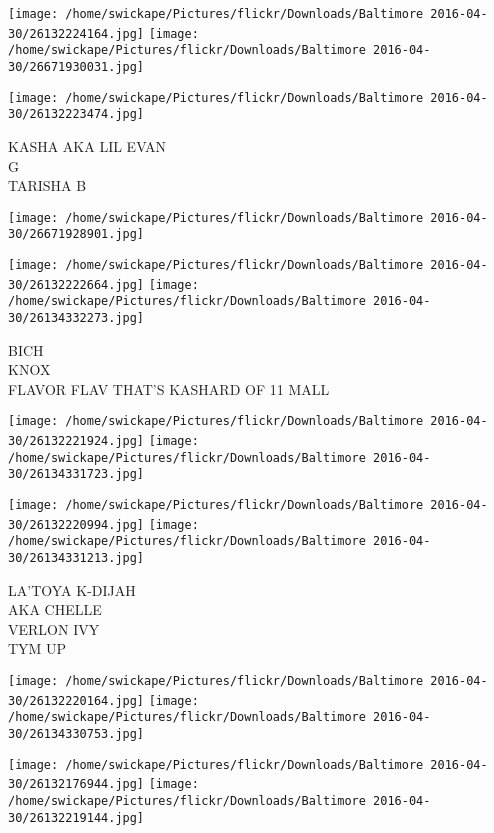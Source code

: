 \documentclass[10pt,letterpaper]{article}
\begin{document}
\texttt{[image: /home/swickape/Pictures/flickr/Downloads/Baltimore 2016-04-30/26132224164.jpg]}
\texttt{[image: /home/swickape/Pictures/flickr/Downloads/Baltimore 2016-04-30/26671930031.jpg]}

\texttt{[image: /home/swickape/Pictures/flickr/Downloads/Baltimore 2016-04-30/26132223474.jpg]}

KASHA AKA LIL EVAN\\
G\\
TARISHA B\\
\pagebreak

\texttt{[image: /home/swickape/Pictures/flickr/Downloads/Baltimore 2016-04-30/26671928901.jpg]}

\vspace{0.25in}
\texttt{[image: /home/swickape/Pictures/flickr/Downloads/Baltimore 2016-04-30/26132222664.jpg]}
\texttt{[image: /home/swickape/Pictures/flickr/Downloads/Baltimore 2016-04-30/26134332273.jpg]}

BICH\\
KNOX\\
FLAVOR FLAV THAT'S KASHARD OF 11 MALL\\
\pagebreak

\texttt{[image: /home/swickape/Pictures/flickr/Downloads/Baltimore 2016-04-30/26132221924.jpg]}
\texttt{[image: /home/swickape/Pictures/flickr/Downloads/Baltimore 2016-04-30/26134331723.jpg]}

\texttt{[image: /home/swickape/Pictures/flickr/Downloads/Baltimore 2016-04-30/26132220994.jpg]}
\texttt{[image: /home/swickape/Pictures/flickr/Downloads/Baltimore 2016-04-30/26134331213.jpg]}

LA'TOYA K{-}DIJAH\\
AKA CHELLE\\
VERLON IVY\\
TYM UP\\
\pagebreak

\texttt{[image: /home/swickape/Pictures/flickr/Downloads/Baltimore 2016-04-30/26132220164.jpg]}
\texttt{[image: /home/swickape/Pictures/flickr/Downloads/Baltimore 2016-04-30/26134330753.jpg]}

\texttt{[image: /home/swickape/Pictures/flickr/Downloads/Baltimore 2016-04-30/26132176944.jpg]}
\texttt{[image: /home/swickape/Pictures/flickr/Downloads/Baltimore 2016-04-30/26132219144.jpg]}
\end{document}
